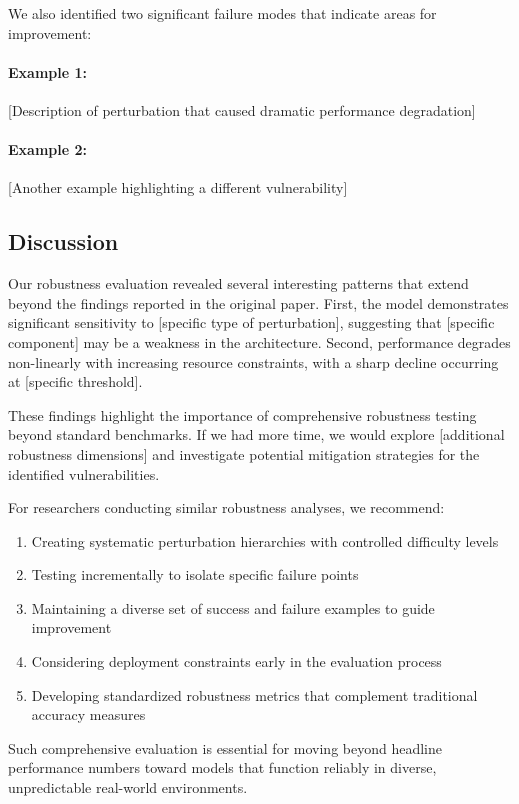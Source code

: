 \documentclass[11pt,a4paper]{article}
\begin{document}
We also identified two significant failure modes that indicate areas for improvement:

\paragraph{Example 1:} [Description of perturbation that caused dramatic performance degradation]

\paragraph{Example 2:} [Another example highlighting a different vulnerability]

\subsection{Discussion}

Our robustness evaluation revealed several interesting patterns that extend beyond the findings reported in the original paper. First, the model demonstrates significant sensitivity to [specific type of perturbation], suggesting that [specific component] may be a weakness in the architecture. Second, performance degrades non-linearly with increasing resource constraints, with a sharp decline occurring at [specific threshold].

These findings highlight the importance of comprehensive robustness testing beyond standard benchmarks. If we had more time, we would explore [additional robustness dimensions] and investigate potential mitigation strategies for the identified vulnerabilities.

For researchers conducting similar robustness analyses, we recommend:
\begin{enumerate}
    \item Creating systematic perturbation hierarchies with controlled difficulty levels
    \item Testing incrementally to isolate specific failure points
    \item Maintaining a diverse set of success and failure examples to guide improvement
    \item Considering deployment constraints early in the evaluation process
    \item Developing standardized robustness metrics that complement traditional accuracy measures
\end{enumerate}

Such comprehensive evaluation is essential for moving beyond headline performance numbers toward models that function reliably in diverse, unpredictable real-world environments.
\end{document}
